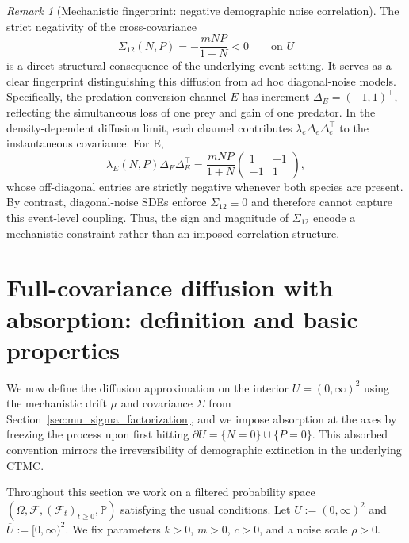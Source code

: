 \documentclass[pdflatex,sn-mathphys-ay]{sn-jnl}
\theoremstyle{thmstyleone}
\theoremstyle{definition}
\theoremstyle{remark}
\newtheorem{remark}[theorem]{Remark}
\begin{document}
\begin{remark}[Mechanistic fingerprint: negative demographic noise correlation]\label{rem:mechanistic_fingerprint_full}
The strict negativity of the cross-covariance
\[
\Sigma_{12}(N,P) = - \frac{mNP}{1+N} < 0 \qquad \text{on } U
\]
is a direct structural consequence of the underlying event setting. 
It serves as a clear fingerprint distinguishing this diffusion from ad hoc diagonal-noise models.
Specifically, the predation-conversion channel $E$ has increment $\Delta_E= (-1,1)^\top$, reflecting the simultaneous loss of one prey and gain of one predator. In the density-dependent diffusion limit, each channel contributes $\lambda_e\Delta_e\Delta_e^\top$ to the instantaneous covariance. For E,
\[
\lambda_E(N,P)\Delta_E\Delta_E^\top = \frac{mNP}{1+N}\begin{pmatrix}
    1 & -1 \\[4pt]
    -1 & 1
\end{pmatrix},
\]
whose off-diagonal entries are strictly negative whenever both species are present. By contrast, diagonal-noise SDEs enforce $\Sigma_{12}\equiv 0$ and therefore cannot capture this event-level coupling. Thus, the sign and magnitude of $\Sigma_{12}$ encode a mechanistic constraint rather than an imposed correlation structure.
\end{remark}

\section{Full-covariance diffusion with absorption: definition and basic properties}
\label{sec:sde_absorption_wellposedness}

We now define the diffusion approximation on the interior $U=(0,\infty)^2$ using the mechanistic drift $\mu$ and
covariance $\Sigma$ from Section~\ref{sec:mu_sigma_factorization}, and we impose absorption at the axes by freezing
the process upon first hitting $\partial U=\{N=0\}\cup\{P=0\}$. This absorbed convention mirrors the
irreversibility of demographic extinction in the underlying CTMC.


Throughout this section we work on a filtered probability space
$(\Omega,\mathcal{F},(\mathcal{F}_t)_{t\ge0},\mathbb{P})$ satisfying the usual conditions.
Let $U:=(0,\infty)^2$ and $\overline U:=[0,\infty)^2$. We fix parameters $k>0$, $m>0$, $c>0$, and a noise scale
$\rho>0$.
\end{document}

